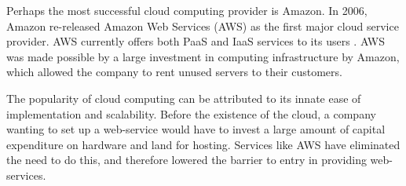 \documentclass[]{report}
\begin{document}
\par
Perhaps the most successful cloud computing provider is Amazon. In 2006, Amazon re-released Amazon Web Services (AWS) as the first major cloud service provider. AWS currently offers both PaaS and IaaS services to its users \cite{carr2008big}. AWS was made possible by a large investment in computing infrastructure by Amazon, which allowed the company to rent unused servers to their customers.
\par
The popularity of cloud computing can be attributed to its innate ease of implementation and scalability. Before the existence of the cloud, a company wanting to set up a web-service would have to invest a large amount of capital expenditure on hardware and land for hosting. Services like AWS have eliminated the need to do this, and therefore lowered the barrier to entry in providing web-services. 

\newpage


\end{document}
